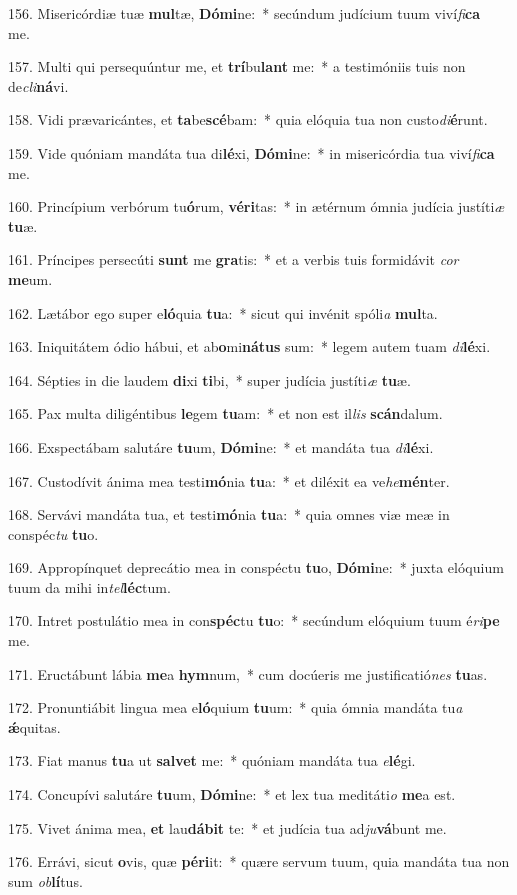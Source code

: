 156. Misericórdiæ tuæ \textbf{mul}tæ, \textbf{Dó}\textbf{mi}ne:~*  secúndum judícium tuum viví\textit{fi}\textbf{ca} me.\

157. Multi qui persequúntur me, et \textbf{trí}bu\textbf{lant} me:~*  a testimóniis tuis non de\textit{cli}\textbf{ná}vi.\

158. Vidi prævaricántes, et \textbf{ta}be\textbf{scé}bam:~*  quia elóquia tua non custo\textit{di}\textbf{é}runt.\

159. Vide quóniam mandáta tua di\textbf{lé}xi, \textbf{Dó}\textbf{mi}ne:~*  in misericórdia tua viví\textit{fi}\textbf{ca} me.\

160. Princípium verbórum tu\textbf{ó}rum, \textbf{vé}\textbf{ri}tas:~*  in ætérnum ómnia judícia justíti\textit{æ} \textbf{tu}æ.\

161. Príncipes persecúti \textbf{sunt} me \textbf{gra}tis:~*  et a verbis tuis formidávit \textit{cor} \textbf{me}um.\

162. Lætábor ego super e\textbf{ló}quia \textbf{tu}a:~*  sicut qui invénit spóli\textit{a} \textbf{mul}ta.\

163. Iniquitátem ódio hábui, et ab\textbf{o}mi\textbf{ná}\textbf{tus} sum:~*  legem autem tuam \textit{di}\textbf{lé}xi.\

164. Sépties in die laudem \textbf{di}xi \textbf{ti}bi,~*  super judícia justíti\textit{æ} \textbf{tu}æ.\

165. Pax multa diligéntibus \textbf{le}gem \textbf{tu}am:~*  et non est il\textit{lis} \textbf{scán}dalum.\

166. Exspectábam salutáre \textbf{tu}um, \textbf{Dó}\textbf{mi}ne:~*  et mandáta tua \textit{di}\textbf{lé}xi.\

167. Custodívit ánima mea testi\textbf{mó}nia \textbf{tu}a:~*  et diléxit ea ve\textit{he}\textbf{mén}ter.\

168. Servávi mandáta tua, et testi\textbf{mó}nia \textbf{tu}a:~*  quia omnes viæ meæ in conspéc\textit{tu} \textbf{tu}o.\

169. Appropínquet deprecátio mea in conspéctu \textbf{tu}o, \textbf{Dó}\textbf{mi}ne:~*  juxta elóquium tuum da mihi in\textit{tel}\textbf{léc}tum.\

170. Intret postulátio mea in con\textbf{spéc}tu \textbf{tu}o:~*  secúndum elóquium tuum é\textit{ri}\textbf{pe} me.\

171. Eructábunt lábia \textbf{me}a \textbf{hym}num,~*  cum docúeris me justificatió\textit{nes} \textbf{tu}as.\

172. Pronuntiábit lingua mea e\textbf{ló}quium \textbf{tu}um:~*  quia ómnia mandáta tu\textit{a} \textbf{ǽ}quitas.\

173. Fiat manus \textbf{tu}a ut \textbf{sal}\textbf{vet} me:~*  quóniam mandáta tua \textit{e}\textbf{lé}gi.\

174. Concupívi salutáre \textbf{tu}um, \textbf{Dó}\textbf{mi}ne:~*  et lex tua meditáti\textit{o} \textbf{me}a est.\

175. Vivet ánima mea, \textbf{et} lau\textbf{dá}\textbf{bit} te:~*  et judícia tua ad\textit{ju}\textbf{vá}bunt me.\

176. Errávi, sicut \textbf{o}vis, quæ \textbf{pér}\textbf{i}it:~*  quære servum tuum, quia mandáta tua non sum \textit{ob}\textbf{lí}tus.\

